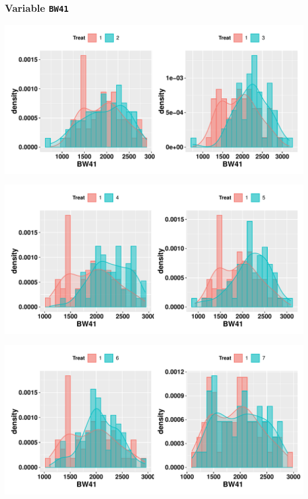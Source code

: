 \documentclass[11pt,a4paper]{article}\usepackage[]{graphicx}\usepackage[]{color}
\makeatletter
\def\maxwidth{ %
  \ifdim\Gin@nat@width>\linewidth
    \linewidth
  \else
    \Gin@nat@width
  \fi
}
\newenvironment{knitrout}{}{} %
\makeatother
\begin{document}
\subsubsection{Variable \texttt{BW41}}
\begin{knitrout}
\color{fgcolor}
\includegraphics[width=\maxwidth]{figure/unnamed-chunk-10-1} 

\includegraphics[width=\maxwidth]{figure/unnamed-chunk-10-2} 

\includegraphics[width=\maxwidth]{figure/unnamed-chunk-10-3} 

\end{knitrout}
\end{document}
